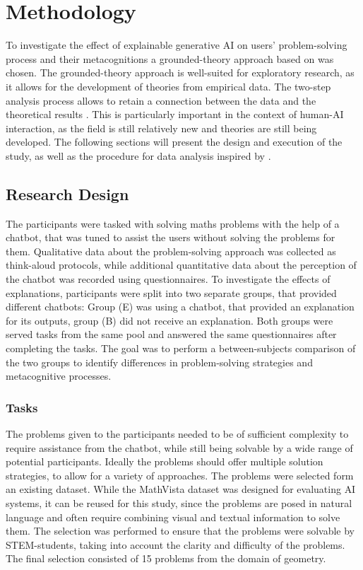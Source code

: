 \section{Methodology} \label{sec:methodology}

To investigate the effect of explainable generative \ac{AI} on users' problem-solving process and their metacognitions a grounded-theory approach based on \textcite{Gioia2013} was chosen. The grounded-theory approach is well-suited for exploratory research, as it allows for the development of theories from empirical data. The two-step analysis process allows to retain a connection between the data and the theoretical results \parencite{Gioia2021}. This is particularly important in the context of human-\ac{AI} interaction, as the field is still relatively new and theories are still being developed. The following sections will present the design and execution of the study, as well as the procedure for data analysis inspired by \textcite{Jussupow2021}.

\subsection{Research Design} \label{ssec:research_design}

The participants were tasked with solving maths problems with the help of a chatbot, that was tuned to assist the users without solving the problems for them. Qualitative data about the problem-solving approach was collected as think-aloud protocols, while additional quantitative data about the perception of the chatbot was recorded using questionnaires. To investigate the effects of explanations, participants were split into two separate groups, that provided different chatbots: Group (E) was using a chatbot, that provided an explanation for its outputs, group (B) did not receive an explanation. Both groups were served tasks from the same pool and answered the same questionnaires after completing the tasks. The goal was to perform a between-subjects comparison of the two groups to identify differences in problem-solving strategies and metacognitive processes.

\subsubsection{Tasks} \label{sssec:tasks}

The problems given to the participants needed to be of sufficient complexity to require assistance from the chatbot, while still being solvable by a wide range of potential participants. Ideally the problems should offer multiple solution strategies, to allow for a variety of approaches. The problems were selected form an existing dataset. While the MathVista dataset \parencite{MathVista2024} was designed for evaluating \ac{AI} systems, it can be reused for this study, since the problems are posed in natural language and often require combining visual and textual information to solve them. The selection was performed to ensure that the problems were solvable by \ac{STEM}-students, taking into account the clarity and difficulty of the problems. The final selection consisted of 15 problems from the domain of geometry.


